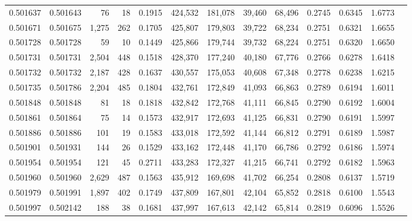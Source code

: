 \begin{tabular}{rrrrrrrrrrrrr}
0.501637 & 0.501643 &    76 &    18 &                                     0.1915 & 424,532 & 181,078 &  39,460 &  68,496 & 0.2745 & 0.6345 & 1.6773 \\
0.501671 & 0.501675 & 1,275 &   262 &                                     0.1705 & 425,807 & 179,803 &  39,722 &  68,234 & 0.2751 & 0.6321 & 1.6655 \\
0.501728 & 0.501728 &    59 &    10 &                                     0.1449 & 425,866 & 179,744 &  39,732 &  68,224 & 0.2751 & 0.6320 & 1.6650 \\
0.501731 & 0.501731 & 2,504 &   448 &                                     0.1518 & 428,370 & 177,240 &  40,180 &  67,776 & 0.2766 & 0.6278 & 1.6418 \\
0.501732 & 0.501732 & 2,187 &   428 &                                     0.1637 & 430,557 & 175,053 &  40,608 &  67,348 & 0.2778 & 0.6238 & 1.6215 \\
0.501735 & 0.501786 & 2,204 &   485 &                                     0.1804 & 432,761 & 172,849 &  41,093 &  66,863 & 0.2789 & 0.6194 & 1.6011 \\
0.501848 & 0.501848 &    81 &    18 &                                     0.1818 & 432,842 & 172,768 &  41,111 &  66,845 & 0.2790 & 0.6192 & 1.6004 \\
0.501861 & 0.501864 &    75 &    14 &                                     0.1573 & 432,917 & 172,693 &  41,125 &  66,831 & 0.2790 & 0.6191 & 1.5997 \\
0.501886 & 0.501886 &   101 &    19 &                                     0.1583 & 433,018 & 172,592 &  41,144 &  66,812 & 0.2791 & 0.6189 & 1.5987 \\
0.501901 & 0.501931 &   144 &    26 &                                     0.1529 & 433,162 & 172,448 &  41,170 &  66,786 & 0.2792 & 0.6186 & 1.5974 \\
0.501954 & 0.501954 &   121 &    45 &                                     0.2711 & 433,283 & 172,327 &  41,215 &  66,741 & 0.2792 & 0.6182 & 1.5963 \\
0.501960 & 0.501960 & 2,629 &   487 &                                     0.1563 & 435,912 & 169,698 &  41,702 &  66,254 & 0.2808 & 0.6137 & 1.5719 \\
0.501979 & 0.501991 & 1,897 &   402 &                                     0.1749 & 437,809 & 167,801 &  42,104 &  65,852 & 0.2818 & 0.6100 & 1.5543 \\
0.501997 & 0.502142 &   188 &    38 &                                     0.1681 & 437,997 & 167,613 &  42,142 &  65,814 & 0.2819 & 0.6096 & 1.5526 \\

\end{tabular}
